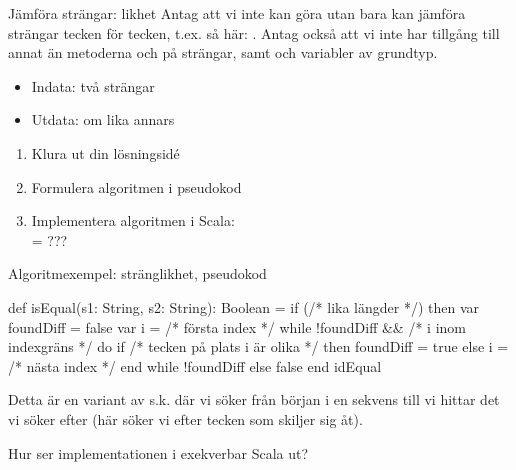 \begin{Slide}{Jämföra strängar: likhet}\SlideFontSmall
Antag att vi inte kan göra  utan bara kan jämföra strängar tecken för tecken,
t.ex. så här: . Antag också att vi inte har tillgång till annat än metoderna  och  på strängar, samt   och variabler av grundtyp. 

\pause
\begin{itemize}
\item Indata: två strängar
\item Utdata:  om lika annars 
\end{itemize}
\begin{enumerate}
\item Klura ut din lösningsidé
\item Formulera algoritmen i pseudokod
\item Implementera algoritmen i Scala: \\ = ???
\end{enumerate}
\end{Slide}

\begin{Slide}{Algoritmexempel: stränglikhet, pseudokod}
\begin{Code}
def isEqual(s1: String, s2: String): Boolean = 
  if (/* lika längder */) then
    var foundDiff = false
    var i = /* första index */
    while !foundDiff && /* i inom indexgräns */ do
      if /* tecken på plats i är olika */ then foundDiff = true
      else i = /* nästa index */
    end while
    !foundDiff
  else false
end idEqual
\end{Code}

\pause\noindent Detta är en variant av s.k.  där vi söker från början i en sekvens till vi hittar det vi söker efter (här söker vi efter tecken som skiljer sig åt).
\\\pause\vspace{1em}

\noindent Hur ser implementationen i exekverbar Scala ut?
\end{Slide}

